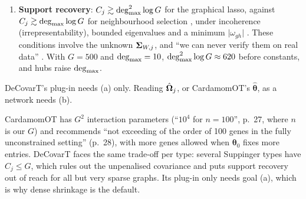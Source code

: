 \documentclass[11pt,a4paper]{article}
\begin{document}
\begin{idbox}[title={Identifiability: covariance versus network}]
\begin{enumerate}[leftmargin=1.6em]
\begin{itemize}
          \item $\mlt(\mathcal G)$ is at most the generic completion rank of $\mathcal G$, with equality
                for nine or fewer vertices (their Theorem~2.2, p.~3);
          \item the $k$-core of $\mathcal G$ is what remains after repeatedly deleting genes of degree
                less than $k$, and the smallest $k$ with an empty $k$-core bounds $\mlt(\mathcal G)$ from
                above (p.~5, after Gross \& Sullivant); sparse graphs have small bounds.
        \end{itemize}
        Their model has a known zero mean. With the mean estimated from the $C_j$ cells, the centred
        sample has rank $C_j-1$, so the requirement reads $C_j-1\ge\mlt(\mathcal G)$ (our reading). In
        their simulations (at most nine variables, independent Gaussian data), the probability that the
        graph selected by the graphical lasso has an  within the sample size rises
        with the penalty and with the sample size; with one observation, the graphical lasso
        \enquote{never selected the graphical model with no edges, the only model with MLT 1}
        (pp.~4--5).
  \item \textbf{Support recovery}: $C_j\gtrsim\deg_{\max}^2\log G$ for the graphical lasso, against
        $C_j\gtrsim\deg_{\max}\log G$ for neighbourhood selection
        \parencite[p.~41]{chiquetContributionsSparseMethods2015}, under incoherence (irrepresentability),
        bounded eigenvalues and a minimum $\lvert\omega_{gh}\rvert$ \parencite{ravikumarHighdimensionalCovarianceEstimation2011}. These conditions involve the unknown $\bm{\Sigma}_{W,j}$, and \enquote{we can never verify
        them on real data} \parencite[p.~77]{chiquetContributionsSparseMethods2015}. With $G=500$ and
        $\deg_{\max}=10$, $\deg_{\max}^2\log G\approx620$ before constants, and hubs raise $\deg_{\max}$.
\end{enumerate}
DeCovarT's plug-in needs (a) only. Reading $\hat{\bm{\Omega}}_j$, or CardamomOT's $\hat{\bm\theta}$, as a
network needs (b).
\end{idbox}

CardamomOT has $G^2$ interaction parameters (\enquote{$10^4$ for $n=100$}, p.~27, where $n$ is our $G$)
and recommends \enquote{not exceeding of the order of 100 genes in the fully unconstrained setting}
(p.~28), with more genes allowed when $\bm\theta_0$ fixes more entries. DeCovarT faces the same trade-off
per type: several Suppinger types have $C_j\le G$, which rules out the unpenalised covariance and puts
support recovery out of reach for all but very sparse graphs. Its plug-in only needs goal (a), which is
why dense shrinkage \parencite{schäferShrinkageApproachLargescale2005} is the default.
\end{document}
